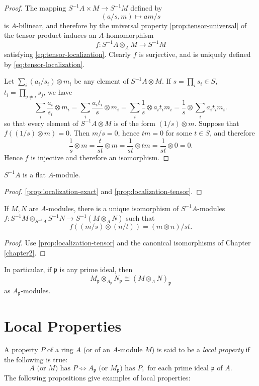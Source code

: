 \begin{proof}
The mapping $S^{-1}A \times M \to S^{-1}M$ defined by
\[
    (a/s, m) \mapsto am/s
\]
is $A$-bilinear, and therefore by the universal property \eqref{prop:tensor-universal} of the tensor product induces an $A$-homomorphism
\[
    f \colon S^{-1}A \otimes_A M \to S^{-1}M
\]
satisfying \eqref{eq:tensor-localization}. Clearly $f$ is surjective, and is uniquely defined by \eqref{eq:tensor-localization}.

Let $\sum_i (a_i/s_i) \otimes m_i$ be any element of $S^{-1}A \otimes M$. If $s = \prod_i s_i \in S$, $t_i = \prod_{j \neq i} s_j$, we have
\[
    \sum_i \frac{a_i}{s_i} \otimes m_i = \sum_i \frac{a_i t_i}{s} \otimes m_i = \sum_i \frac{1}{s} \otimes a_i t_i m_i = \frac{1}{s} \otimes \sum_i a_i t_i m_i.
\]
so that every element of $S^{-1}A \otimes M$ is of the form $(1/s) \otimes m$. Suppose that $f((1/s) \otimes m) = 0$. Then $m/s = 0$, hence $tm = 0$ for some $t \in S$, and therefore
\[
    \frac{1}{s} \otimes m = \frac{t}{st} \otimes m = \frac{1}{st} \otimes tm = \frac{1}{st} \otimes 0 = 0.
\]
Hence $f$ is injective and therefore an isomorphism.
\end{proof}

\begin{corollary}\label{cor:flat-localization}
$S^{-1}A$ is a flat $A$-module.
\end{corollary}

\begin{proof}
    \eqref{prop:localization-exact} and \eqref{prop:localization-tensor}.
\end{proof}

\begin{proposition}\label{prop:localization-tensor-product}
If $M, N$ are $A$-modules, there is a unique isomorphism of $S^{-1}A$-modules $f \colon S^{-1}M \otimes_{S^{-1}A} S^{-1}N \to S^{-1}(M \otimes_A N)$ such that
\[
    f((m/s) \otimes (n/t)) = (m \otimes n)/st.
\]
\end{proposition}

\begin{proof}
    Use \eqref{prop:localization-tensor} and the canonical isomorphisms of Chapter \ref{chapter2}.
\end{proof}

In particular, if $\mathfrak{p}$ is any prime ideal, then
\[
    M_{\mathfrak{p}} \otimes_{A_{\mathfrak{p}}} N_{\mathfrak{p}} \cong (M \otimes_A N)_{\mathfrak{p}}
\]
as $A_{\mathfrak{p}}$-modules.

\section*{Local Properties}
A property $P$ of a ring $A$ (or of an $A$-module $M$) is said to be a \emph{local property} if the following is true:
\[
    A \text{ (or } M) \text{ has } P \iff A_{\mathfrak{p}} \text{ (or } M_{\mathfrak{p}}) \text{ has } P, \text{ for each prime ideal } \mathfrak{p} \text{ of } A.
\]
The following propositions give examples of local properties:

